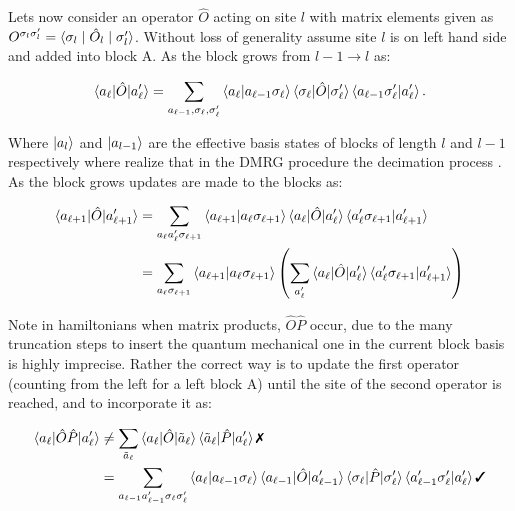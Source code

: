 \documentclass{article}
\begin{document}
\vspace{1em}

\noindent Lets now consider an operator $\hat O$ acting on site $l$ with matrix elements given as $O^{\sigma_l \sigma_l'} = \braket{\sigma_l \mid \hat O_l \mid \sigma_l'}$. Without loss of generality assume site $l$ is on left hand side and added into block A. As the block grows from $l-1 \rightarrow l$ as: 

\[
\braket{a_{\ell} | \hat{O} | a'_{\ell}} = \sum_{a_{\ell-1}, \sigma_{\ell}, \sigma'_{\ell}} 
\braket{a_{\ell} | a_{\ell-1} \sigma_{\ell}} 
\braket{\sigma_{\ell} | \hat{O} | \sigma'_{\ell}} 
\braket{a_{\ell-1} \sigma'_{\ell} | a'_{\ell}}.
\]

\noindent Where $\ket{a_l}$ and $\ket{a_{l-1}}$ are the effective basis states of blocks of length $l$ and $l-1$ respectively where realize that in the DMRG procedure the decimation process . As the block grows updates are made to the blocks as:

\begin{align*}
\braket{a_{\ell+1} | \hat{O} | a'_{\ell+1}} &= \sum_{a_{\ell} a'_{\ell} \sigma_{\ell+1}} 
\braket{a_{\ell+1} | a_{\ell} \sigma_{\ell+1}} 
\braket{a_{\ell} | \hat{O} | a'_{\ell}} 
\braket{a'_{\ell} \sigma_{\ell+1} | a'_{\ell+1}}\\
&= \sum_{a_{\ell} \sigma_{\ell+1}} 
\braket{a_{\ell+1} | a_{\ell} \sigma_{\ell+1}} 
\left( \sum_{a'_{\ell}} 
\braket{a_{\ell} | \hat{O} | a'_{\ell}} 
\braket{a'_{\ell} \sigma_{\ell+1} | a'_{\ell+1}} 
\right) 
\end{align*}

\noindent Note in hamiltonians when matrix products, $\hat{O}\hat{P}$ occur, due to the many truncation steps to insert the quantum mechanical one in the current block basis is highly imprecise. Rather the correct way is to update the first operator (counting from the left for a left block A) until the site of the second operator is reached, and to incorporate it as:

\begin{align*}
\braket{a_{\ell} | \hat{O} \hat{P} | a'_{\ell}} 
&\neq \sum_{\tilde{a}_{\ell}} 
\braket{a_{\ell} | \hat{O} | \tilde{a}_{\ell}} 
\braket{\tilde{a}_{\ell} | \hat{P} | a'_{\ell}} \text{\ding{55}} \\
&= \sum_{a_{\ell-1} a'_{\ell-1} \sigma_{\ell} \sigma'_{\ell}} 
\braket{a_{\ell} | a_{\ell-1} \sigma_{\ell}} 
\braket{a_{\ell-1} | \hat{O} | a'_{\ell-1}} 
\braket{\sigma_{\ell} | \hat{P} | \sigma'_{\ell}} 
\braket{a'_{\ell-1} \sigma'_{\ell} | a'_{\ell}} \text{\ding{51}}
\end{align*}
\end{document}
